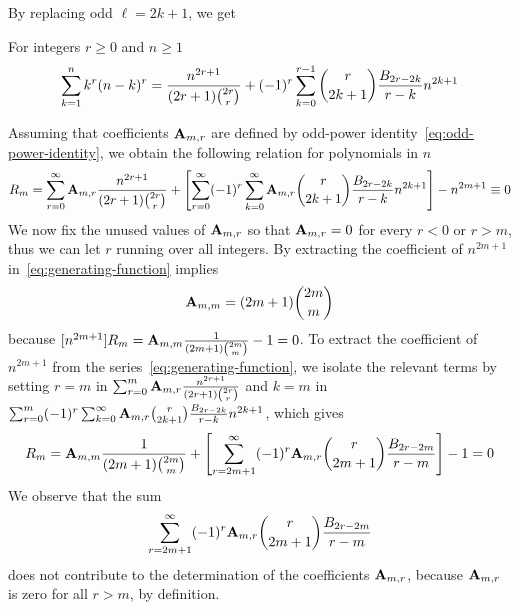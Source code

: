 By replacing odd $\ell = 2k+1$, we get
\begin{proposition}
    For integers $r \geq 0$ and $n \geq 1$
    \label{prop:bivariate-faulhabers-formula}
    \begin{align*}
        \sum_{k=1}^{n} k^{r} (n-k)^{r}
        = \frac{n^{2r+1}}{(2r+1) \binom{2r}{r}}
        + (-1)^r \sum_{k=0}^{r-1} \binom{r}{2k+1} \frac{{B}\sb{2r-2k}}{r-k} n^{2k+1}
    \end{align*}
\end{proposition}
Assuming that coefficients ${\mathbf{A}} \sb{m,r}$ are defined
by odd-power identity~\eqref{eq:odd-power-identity},
we obtain the following relation for polynomials in $n$
\begin{align}
    \label{eq:generating-function}
    R_{m} = \sum_{r=0}^{\infty} {\mathbf{A}} \sb{m,r} \frac{n^{2r+1}}{(2r+1) \binom{2r}{r}}
    + \left[ \sum_{r=0}^{\infty} (-1)^r \sum_{k=0}^{\infty} {\mathbf{A}} \sb{m,r} \binom{r}{2k+1} \frac{{B}\sb{2r-2k}}{r-k} n^{2k+1} \right]
    - n^{2m+1} \equiv 0
\end{align}
We now fix the unused values of ${\mathbf{A}} \sb{m,r}$ so that ${\mathbf{A}} \sb{m,r} = 0$ for every $r < 0$ or $r > m$,
thus we can let $r$ running over all integers.
By extracting the coefficient of $n^{2m+1}$ in~\eqref{eq:generating-function} implies
\begin{align*}
    {\mathbf{A}} \sb{m,m} = (2m+1)\binom{2m}{m}
\end{align*}
because $[n^{2m+1}]R_m = {\mathbf{A}} \sb{m,m} \frac{1}{(2m+1) \binom{2m}{m}} - 1 = 0$.
To extract the coefficient of $n^{2m+1}$ from the series~\eqref{eq:generating-function},
we isolate the relevant terms by setting $r = m$ in $\sum_{r=0}^{m} {\mathbf{A}} \sb{m,r} \frac{n^{2r+1}}{(2r+1) \binom{2r}{r}}$
and $k = m$ in $\sum_{r=0}^{m} (-1)^r \sum_{k=0}^{\infty} {\mathbf{A}} \sb{m,r} \binom{r}{2k+1} \frac{{B}\sb{2r-2k}}{r-k} n^{2k+1}$,
which gives
\begin{align*}
[n^{2m+1}]
    R_{m}
    = \coeffA{m}{m} \frac{1}{(2m+1) \binom{2m}{m}}
    + \left[ \sum_{r=2m+1}^{\infty} (-1)^r \coeffA{m}{r} \binom{r}{2m+1} \frac{\bernoulli{2r-2m}}{r-m} \right]
    - 1 = 0
\end{align*}
We observe that the sum
\begin{align*}
    \sum_{r=2m+1}^{\infty} (-1)^r {\mathbf{A}} \sb{m,r} \binom{r}{2m+1} \frac{{B}\sb{2r-2m}}{r-m}
\end{align*}
does not contribute to the determination of the coefficients ${\mathbf{A}} \sb{m,r}$, because ${\mathbf{A}} \sb{m,r}$ is zero
for all $r > m$, by definition.
